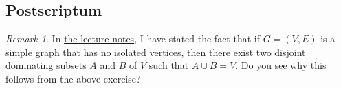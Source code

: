 \documentclass[paper=a4, fontsize=12pt]{scrartcl} %
\newcommand{\tup}[1]{\left( #1 \right)}
\theoremstyle{plainsl}
\theoremstyle{definition}
\theoremstyle{remark}
\newtheorem{remark}[theorem]{Remark}
\begin{document}
\subsection{Postscriptum}

\begin{remark}
In
\href{http://www-users.math.umn.edu/~dgrinber/5707s17/nogra.pdf}{the lecture notes},
I have stated the fact that
if $G = \tup{V, E}$ is a simple graph that has no isolated vertices,
then there exist two disjoint dominating subsets $A$ and $B$
of $V$ such that $A \cup B = V$. Do you see why this follows from
the above exercise?
\end{remark}

\end{document}
